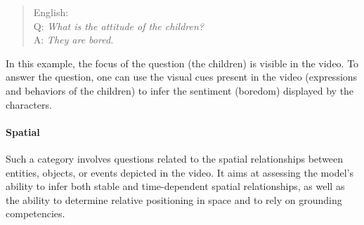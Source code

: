     
\begin{quote}
        English:\\
Q: \textit{What is the attitude of the children?}\\
A: \textit{They are bored.}\\
    \end{quote}
In this example, the focus of the question (the children) is visible in the video. To answer the question, one can use the visual cues present in the video (expressions and behaviors of the children) to infer the sentiment (boredom) displayed by the characters.

\paragraph{{\textbf{Spatial}}}
Such a category involves questions related to the spatial relationships between entities, objects, or events depicted in the video. It aims at assessing the model’s ability to infer both stable and time-dependent spatial relationships, as well as the ability to determine relative positioning in space and to rely on grounding competencies.

